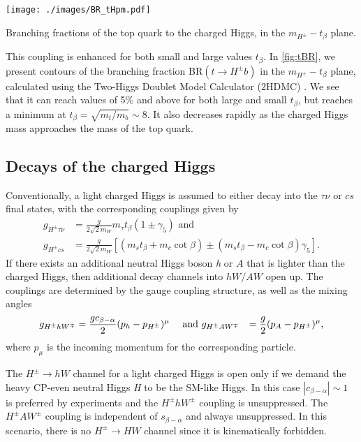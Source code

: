 \begin{marginfigure}[-1in]
\centering
	\texttt{[image: ./images/BR\_tHpm.pdf]}
\caption{Branching fractions of the top quark to the charged Higgs, in the $m_{H^{\pm}}-t_{\beta}$ plane.}
\label{fig:tBR}
\end{marginfigure}

This coupling is enhanced for both small and large values $t_{\beta}$. In \autoref{fig:tBR}, we present contours of the branching fraction BR$(t \rightarrow H^{\pm} b)$ in the $m_{H^{\pm}}-t_{\beta}$ plane, calculated using the Two-Higgs Doublet Model Calculator ($2$HDMC) \cite{Eriksson:2009ws}. We see that it can reach values of 5\% and above for both large and small $t_{\beta}$, but reaches a minimum at $t_{\beta} = \sqrt{m_t/m_b}\sim 8 $. It also decreases rapidly as the charged Higgs mass approaches the mass of the top quark.

\subsection{Decays of the charged Higgs}
Conventionally, a light charged Higgs is assumed to either decay into the $\tau\nu$ or $cs$ final states, with the corresponding couplings given by
\begin{align*}
  g_{H^{\pm} \tau\nu} &= \frac{g}{2 \sqrt{2} m_W} m_\tau t_{\beta}(1\pm \gamma_5 ) \text{ and} \\
g_{H^{\pm} cs} &= \frac{g}{2 \sqrt{2} m_W} \left[ (m_s t_{\beta} + m_c \cot \beta ) \pm (m_s t_{\beta} - m_c \cot \beta ) \gamma_5 \right].
 \end{align*}
If there exists an additional neutral Higgs boson \emph{h} or $A$ that is lighter than the charged Higgs, then additional decay channels into $hW/AW$ open up. The couplings are determined by the gauge coupling structure, as well as the mixing angles \cite{Gunion:1989we} 
\begin{align*}
  g_{H^{\pm} h W^{\mp}}&= \frac{gc_{\beta-\alpha}}{2}(p_{h}-p_{H^{\pm}})^\mu &\text{ and }& 
 g_{H^{\pm} A W^{\mp}}&= \frac{g}{2}(p_{A}-p_{H^{\pm}})^\mu,
 \end{align*}
where $p_\mu$ is the incoming momentum for the corresponding particle. 

The $H^{\pm}\rightarrow hW$ channel for a light charged Higgs is open only if we demand the heavy CP-even neutral Higgs \emph{H} to be the SM-like Higgs. In this case $|c_{\beta-\alpha}| \sim 1$ is preferred by experiments and the $H^{\pm}hW^{\pm}$ coupling is unsuppressed. The $H^{\pm} A W^{\pm}$ coupling is independent of $s_{\beta-\alpha}$ and always unsuppressed. In this scenario, there is no $H^{\pm} \rightarrow HW$ channel since it is kinematically forbidden.

